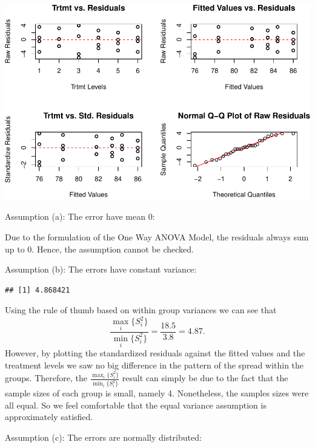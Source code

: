 \documentclass[12pt,]{article}
\newenvironment{Shaded}{\begin{snugshade}}{\end{snugshade}}
\newcommand{\KeywordTok}[1]{\textcolor[rgb]{0.13,0.29,0.53}{\textbf{#1}}}
\newcommand{\StringTok}[1]{\textcolor[rgb]{0.31,0.60,0.02}{#1}}
\newcommand{\OperatorTok}[1]{\textcolor[rgb]{0.81,0.36,0.00}{\textbf{#1}}}
\newcommand{\NormalTok}[1]{#1}
\begin{document}
\includegraphics{Markdown_HW_5_files/figure-latex/unnamed-chunk-5-1.pdf}

Assumption (a): The error have mean 0:

Due to the formulation of the One Way ANOVA Model, the residuals always
sum up to 0. Hence, the assumption cannot be checked.

Assumption (b): The errors have constant variance:

\begin{Shaded}
\end{Shaded}

\begin{verbatim}
## [1] 4.868421
\end{verbatim}

Using the rule of thumb based on within group variances we can see that
\[\frac{\max_i\{S_i^2 \}}{\min_i\{S_i^2 \}} =\frac{18.5}{3.8} = 4.87.\]
However, by plotting the standardized residuals against the fitted
values and the treatment levels we saw no big difference in the pattern
of the spread within the groups. Therefore, the
\(\frac{\max_i\{S_i^2 \}}{\min_i\{S_i^2 \}}\) result can simply be due
to the fact that the sample sizes of each group is small, namely 4.
Nonetheless, the samples sizes were all equal. So we feel comfortable
that the equal variance assumption is approximately satisfied.

Assumption (c): The errors are normally distributed:
\end{document}
